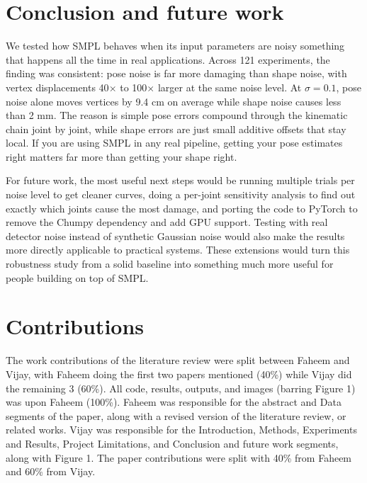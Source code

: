 \documentclass[final]{article}
\begin{document}
\section{Conclusion and future work}\label{sec:concl}
We tested how SMPL behaves when its input parameters are noisy something that 
happens all the time in real applications. Across 121 experiments, the finding was 
consistent: pose noise is far more damaging than shape noise, with vertex displacements 
40$\times$ to 100$\times$ larger at the same noise level. At $\sigma = 0.1$, pose noise 
alone moves vertices by 9.4 cm on average while shape noise causes less than 2 mm. 
The reason is simple pose errors compound through the kinematic chain joint by 
joint, while shape errors are just small additive offsets that stay local. If you are 
using SMPL in any real pipeline, getting your pose estimates right matters far more 
than getting your shape right.

For future work, the most useful next steps would be running multiple trials per noise 
level to get cleaner curves, doing a per-joint sensitivity analysis to find out exactly 
which joints cause the most damage, and porting the code to PyTorch to remove the 
Chumpy dependency and add GPU support. Testing with real detector noise instead of 
synthetic Gaussian noise would also make the results more directly applicable to 
practical systems. These extensions would turn this robustness study from a solid 
baseline into something much more useful for people building on top of SMPL.  \medskip

\section{Contributions}

The work contributions of the literature review were split between Faheem and Vijay, with Faheem doing the first two papers mentioned (40\%) while Vijay did the remaining 3 (60\%). All code, results, outputs, and images (barring Figure 1) was upon Faheem (100\%). Faheem was responsible for the abstract and Data segments of the paper, along with a revised version of the literature review, or related works. Vijay was responsible for the Introduction, Methods, Experiments and Results, Project Limitations, and Conclusion and future work segments, along with Figure 1. The paper contributions were split with 40\% from Faheem and 60\% from Vijay.

\small


\end{document}
